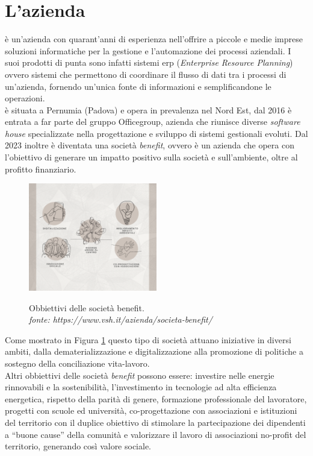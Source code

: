 \section{L'azienda}
{\company} è un'azienda con quarant'anni di esperienza nell'offrire a piccole e medie imprese soluzioni informatiche per la 
gestione e l'automazione dei processi aziendali. I suoi prodotti di punta sono infatti sistemi \gls{erp} (\textit{Enterprise 
Resource Planning}) ovvero sistemi che permettono di coordinare il flusso di dati tra i processi di un'azienda, fornendo un'unica fonte di 
informazioni e semplificandone le operazioni.\\
{\company} è situata a Pernumia (Padova) e opera in prevalenza nel Nord Est, dal 2016 è entrata a far parte del gruppo Officegroup, azienda 
che riunisce diverse \textit{software house} specializzate nella progettazione e sviluppo di sistemi gestionali evoluti. 
Dal 2023 inoltre è diventata una società \textit{benefit}, ovvero è un azienda che opera con l'obiettivo di generare un impatto positivo 
sulla società e sull'ambiente, oltre al profitto finanziario.

\begin{figure}[H]
    \centering
    \includegraphics[alt={Obbiettivi delle società benefit}, width=0.5\textwidth]{img/soc-benefit.png}
    \caption{Obbiettivi delle società benefit. \\ \textit{fonte: https://www.vsh.it/azienda/societa-benefit/}}
    \label{fig:società benefit}
\end{figure}

Come mostrato in Figura \ref{fig:società benefit} questo tipo di società attuano iniziative in diversi ambiti, dalla dematerializzazione 
e digitalizzazione alla promozione di politiche a sostegno della conciliazione vita-lavoro.\\
Altri obbiettivi delle società \textit{benefit} possono essere: investire nelle energie rinnovabili e la sostenibilità, l'investimento in tecnologie 
ad alta efficienza energetica, rispetto della parità di genere, formazione professionale del lavoratore, progetti con scuole ed 
università, co-progettazione con associazioni e istituzioni del territorio con il duplice obiettivo di stimolare la partecipazione dei dipendenti 
a “buone cause” della comunità e valorizzare il lavoro di associazioni no-profit del territorio, generando così valore sociale.

